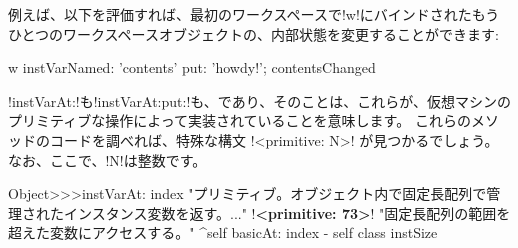 \documentclass[a4paper,10pt,twoside]{book}
\begin{document}
例えば、以下を評価すれば、最初のワークスペースで\ct!w!にバインドされたもうひとつのワークスペースオブジェクトの、内部状態を変更することができます: %
\begin{code}{}
w instVarNamed: 'contents' put: 'howdy!'; contentsChanged
\end{code}


\ct!instVarAt:!も\ct!instVarAt:put:!も、であり、そのことは、これらが、\pharo 仮想マシンのプリミティブな操作によって実装されていることを意味します。
これらのメソッドのコードを調べれば、特殊な構文 \ct!<primitive: N>! が見つかるでしょう。なお、ここで、\ct!N!は整数です。

\begin{code}{}
Object>>>instVarAt: index 
	"プリミティブ。オブジェクト内で固定長配列で管理されたインスタンス変数を返す。..."
	!\textbf{<primitive: 73>}!
	"固定長配列の範囲を超えた変数にアクセスする。"
	^self basicAt: index - self class instSize		
\end{code}
\end{document}

